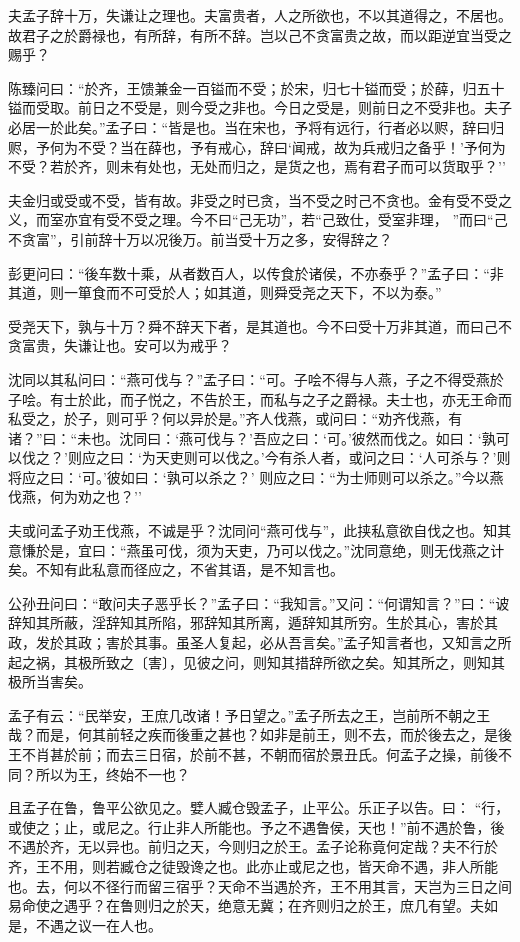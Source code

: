 \documentclass[]{article}
\begin{document}
夫孟子辞十万，失谦让之理也。夫富贵者，人之所欲也，不以其道得之，不居也。故君子之於爵禄也，有所辞，有所不辞。岂以己不贪富贵之故，而以距逆宜当受之赐乎？

陈臻问曰：``於齐，王馈兼金一百镒而不受；於宋，归七十镒而受；於薛，归五十镒而受取。前日之不受是，则今受之非也。今日之受是，则前日之不受非也。夫子必居一於此矣。''孟子曰：``皆是也。当在宋也，予将有远行，行者必以赆，辞曰归赆，予何为不受？当在薛也，予有戒心，辞曰`闻戒，故为兵戒归之备乎！'予何为不受？若於齐，则未有处也，无处而归之，是货之也，焉有君子而可以货取乎？''

夫金归或受或不受，皆有故。非受之时已贪，当不受之时己不贪也。金有受不受之义，而室亦宜有受不受之理。今不曰``己无功''，若``己致仕，受室非理，
''而曰``己不贪富''，引前辞十万以况後万。前当受十万之多，安得辞之？

彭更问曰：``後车数十乘，从者数百人，以传食於诸侯，不亦泰乎？''孟子曰：``非其道，则一箪食而不可受於人；如其道，则舜受尧之天下，不以为泰。''

受尧天下，孰与十万？舜不辞天下者，是其道也。今不曰受十万非其道，而曰己不贪富贵，失谦让也。安可以为戒乎？

沈同以其私问曰：``燕可伐与？''孟子曰：``可。子哙不得与人燕，子之不得受燕於子哙。有士於此，而子悦之，不告於王，而私与之子之爵禄。夫士也，亦无王命而私受之，於子，则可乎？何以异於是。''齐人伐燕，或问曰：``劝齐伐燕，有诸？''曰：``未也。沈同曰：`燕可伐与？'吾应之曰：`可。'彼然而伐之。如曰：`孰可以伐之？'则应之曰：`为天吏则可以伐之。'今有杀人者，或问之曰：`人可杀与？'则将应之曰：`可。'彼如曰：`孰可以杀之？'
则应之曰：``为士师则可以杀之。''今以燕伐燕，何为劝之也？''

夫或问孟子劝王伐燕，不诚是乎？沈同问``燕可伐与''，此挟私意欲自伐之也。知其意慊於是，宜曰：``燕虽可伐，须为天吏，乃可以伐之。''沈同意绝，则无伐燕之计矣。不知有此私意而径应之，不省其语，是不知言也。

公孙丑问曰：``敢问夫子恶乎长？''孟子曰：``我知言。''又问：``何谓知言？''曰：``诐辞知其所蔽，淫辞知其所陷，邪辞知其所离，遁辞知其所穷。生於其心，害於其政，发於其政；害於其事。虽圣人复起，必从吾言矣。''孟子知言者也，又知言之所起之祸，其极所致之〔害〕，见彼之问，则知其措辞所欲之矣。知其所之，则知其极所当害矣。

孟子有云：``民举安，王庶几改诸！予日望之。''孟子所去之王，岂前所不朝之王哉？而是，何其前轻之疾而後重之甚也？如非是前王，则不去，而於後去之，是後王不肖甚於前；而去三日宿，於前不甚，不朝而宿於景丑氏。何孟子之操，前後不同？所以为王，终始不一也？

且孟子在鲁，鲁平公欲见之。嬖人臧仓毁孟子，止平公。乐正子以告。曰：
``行，或使之；止，或尼之。行止非人所能也。予之不遇鲁侯，天也！''前不遇於鲁，後不遇於齐，无以异也。前归之天，今则归之於王。孟子论称竟何定哉？夫不行於齐，王不用，则若臧仓之徒毁谗之也。此亦止或尼之也，皆天命不遇，非人所能也。去，何以不径行而留三宿乎？天命不当遇於齐，王不用其言，天岂为三日之间易命使之遇乎？在鲁则归之於天，绝意无冀；在齐则归之於王，庶几有望。夫如是，不遇之议一在人也。
\end{document}
